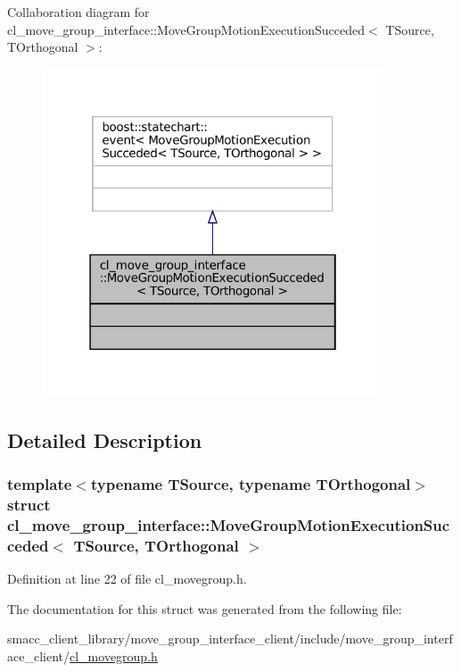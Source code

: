 Collaboration diagram for cl\+\_\+move\+\_\+group\+\_\+interface\+:\+:Move\+Group\+Motion\+Execution\+Succeded$<$ T\+Source, T\+Orthogonal $>$\+:
\nopagebreak
\begin{figure}[H]
\begin{center}
\leavevmode
\includegraphics[width=286pt]{structcl__move__group__interface_1_1MoveGroupMotionExecutionSucceded__coll__graph}
\end{center}
\end{figure}


\subsection{Detailed Description}
\subsubsection*{template$<$typename T\+Source, typename T\+Orthogonal$>$\newline
struct cl\+\_\+move\+\_\+group\+\_\+interface\+::\+Move\+Group\+Motion\+Execution\+Succeded$<$ T\+Source, T\+Orthogonal $>$}



Definition at line 22 of file cl\+\_\+movegroup.\+h.



The documentation for this struct was generated from the following file\+:\begin{DoxyCompactItemize}
\item 
smacc\+\_\+client\+\_\+library/move\+\_\+group\+\_\+interface\+\_\+client/include/move\+\_\+group\+\_\+interface\+\_\+client/\hyperlink{cl__movegroup_8h}{cl\+\_\+movegroup.\+h}\end{DoxyCompactItemize}
